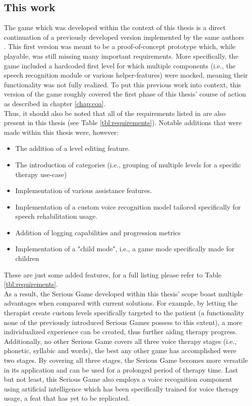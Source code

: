 \documentclass[draft,final]{vutinfth} %
\begin{document}
\subsection{This work}
The game which was developed within the context of this thesis is a direct continuation of a previously developed version implemented by the same authors \cite{LEPaper}. This first version was meant to be a proof-of-concept prototype which,  while playable, was still missing many important requirements. More specifically, the game included a hardcoded first level for which multiple components (i.e., the speech recognition module or various helper-features) were mocked, meaning their functionality was not fully realized. To put this previous work into context, this version of the game roughly covered the first phase of this thesis' course of action as described in chapter \ref{chap:coa}. \\
Thus, it should also be noted that all of the requirements listed in \cite{LEPaper} are also present in this thesis (see Table \ref{tbl:requirements}). Notable additions that were made within this thesis were, however: 
\begin{itemize}
\item The addition of a level editing feature.
\item The introduction of categories (i.e., grouping of multiple levels for a specific therapy use-case)
\item Implementation of various assistance features.
\item Implementation of a custom voice recognition model tailored specifically for speech rehabilitation usage.
\item Addition of logging capabilities and progression metrics
\item Implementation of a "child mode", i.e., a game mode specifically made for children
\end{itemize}
These are just some added features, for a full listing please refer to Table \ref{tbl:requirements}. \\
As a result, the Serious Game developed within this thesis' scope boast multiple advantages when compared with current solutions. For example, by letting the therapist create custom levels specifically targeted to the patient (a functionality none of the previously introduced Serious Games possess to this extent), a more individualized experience can be created, thus further aiding therapy progress. Additionally, no other Serious Game covers all three voice therapy stages (i.e., phonetic, syllabic and words), the best any other game has accomplished were two stages. By covering all three stages, the Serious Game becomes more versatile in its application and can be used for a prolonged period of therapy time. Last but not least, this Serious Game also employs a voice recognition component using artificial intelligence which has been specifically trained for voice therapy usage, a feat that has yet to be replicated.
\end{document}
